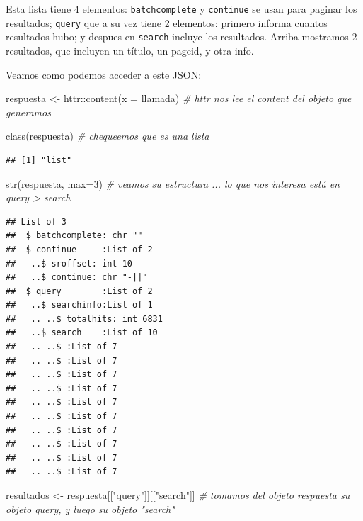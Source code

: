 \documentclass[
]{book}
\newenvironment{Shaded}{\begin{snugshade}}{\end{snugshade}}
\newcommand{\AttributeTok}[1]{\textcolor[rgb]{0.77,0.63,0.00}{#1}}
\newcommand{\CommentTok}[1]{\textcolor[rgb]{0.56,0.35,0.01}{\textit{#1}}}
\newcommand{\DecValTok}[1]{\textcolor[rgb]{0.00,0.00,0.81}{#1}}
\newcommand{\FunctionTok}[1]{\textcolor[rgb]{0.00,0.00,0.00}{#1}}
\newcommand{\NormalTok}[1]{#1}
\newcommand{\OtherTok}[1]{\textcolor[rgb]{0.56,0.35,0.01}{#1}}
\newcommand{\SpecialCharTok}[1]{\textcolor[rgb]{0.00,0.00,0.00}{#1}}
\newcommand{\StringTok}[1]{\textcolor[rgb]{0.31,0.60,0.02}{#1}}
\begin{document}
Esta lista tiene 4 elementos: \texttt{batchcomplete} y \texttt{continue} se usan para paginar los resultados; \texttt{query} que a su vez tiene 2 elementos: primero informa cuantos resultados hubo; y despues en \texttt{search} incluye los resultados. Arriba mostramos 2 resultados, que incluyen un título, un pageid, y otra info.

Veamos como podemos acceder a este JSON:

\begin{Shaded}
\begin{Highlighting}[]
\NormalTok{respuesta }\OtherTok{\textless{}{-}}\NormalTok{ httr}\SpecialCharTok{::}\FunctionTok{content}\NormalTok{(}\AttributeTok{x =}\NormalTok{ llamada) }\CommentTok{\# httr nos lee el content del objeto que generamos}

\FunctionTok{class}\NormalTok{(respuesta) }\CommentTok{\# chequeemos que es una lista}
\end{Highlighting}
\end{Shaded}

\begin{verbatim}
## [1] "list"
\end{verbatim}

\begin{Shaded}
\begin{Highlighting}[]
\FunctionTok{str}\NormalTok{(respuesta, }\AttributeTok{max=}\DecValTok{3}\NormalTok{) }\CommentTok{\# veamos su estructura ... lo que nos interesa está en query \textgreater{} search}
\end{Highlighting}
\end{Shaded}

\begin{verbatim}
## List of 3
##  $ batchcomplete: chr ""
##  $ continue     :List of 2
##   ..$ sroffset: int 10
##   ..$ continue: chr "-||"
##  $ query        :List of 2
##   ..$ searchinfo:List of 1
##   .. ..$ totalhits: int 6831
##   ..$ search    :List of 10
##   .. ..$ :List of 7
##   .. ..$ :List of 7
##   .. ..$ :List of 7
##   .. ..$ :List of 7
##   .. ..$ :List of 7
##   .. ..$ :List of 7
##   .. ..$ :List of 7
##   .. ..$ :List of 7
##   .. ..$ :List of 7
##   .. ..$ :List of 7
\end{verbatim}

\begin{Shaded}
\begin{Highlighting}[]
\NormalTok{resultados }\OtherTok{\textless{}{-}}\NormalTok{ respuesta[[}\StringTok{"query"}\NormalTok{]][[}\StringTok{"search"}\NormalTok{]] }\CommentTok{\# tomamos del objeto respuesta su objeto query, y luego su objeto "search"}
\end{Highlighting}
\end{Shaded}
\end{document}
